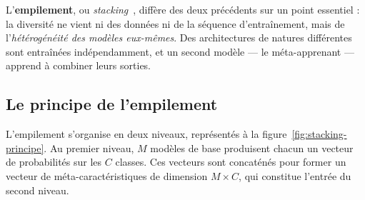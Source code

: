L'\textbf{empilement}, ou \emph{stacking}~\cite{wolpert1992}, diffère des deux
précédents sur un point essentiel : la diversité ne vient ni des données ni de la
séquence d'entraînement, mais de l'\emph{hétérogénéité des modèles eux-mêmes}. Des
architectures de natures différentes sont entraînées indépendamment, et un second
modèle — le méta-apprenant — apprend à combiner leurs sorties.

\subsection{Le principe de l'empilement}

L'empilement s'organise en deux niveaux, représentés à la
figure~\ref{fig:stacking-principe}. Au premier niveau, $M$ modèles de base produisent
chacun un vecteur de probabilités sur les $C$ classes. Ces vecteurs sont concaténés
pour former un vecteur de méta-caractéristiques de dimension $M \times C$, qui
constitue l'entrée du second niveau.

